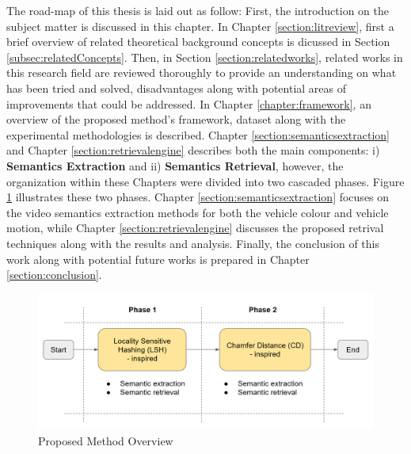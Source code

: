The road-map of this thesis is laid out as follow: First, the introduction on the subject matter is discussed in this chapter. 
In Chapter \ref{section:litreview}, first a brief overview of related theoretical background concepts is dicussed in Section \ref{subsec:relatedConcepts}. Then, in Section \ref{section:relatedworks}, related works in this research field are reviewed thoroughly to provide an understanding on what has been tried and solved, disadvantages along with potential areas of improvements that could be addressed. 
In Chapter \ref{chapter:framework}, an overview of the proposed method's framework, dataset along with the experimental methodologies is described.
Chapter \ref{section:semanticsextraction} and Chapter \ref{section:retrievalengine} describes both the main components: i) \textbf{Semantics Extraction} and ii) \textbf{Semantics Retrieval}, however, the organization within these Chapters were divided into two cascaded phases. 
Figure \ref{fig:proposedmethodoverview} illustrates these two phases.
Chapter \ref{section:semanticsextraction} focuses on the video semantics extraction methods for both the vehicle colour and vehicle motion, while Chapter \ref{section:retrievalengine} discusses the proposed retrival techniques along with the results and analysis.
Finally, the conclusion of this work along with potential future works is prepared in Chapter \ref{section:conclusion}.



\begin{figure}[!hbt]\centering
\includegraphics[width=\textwidth]{image/general/phases.PNG}
\caption{Proposed Method Overview}
\label{fig:proposedmethodoverview}
\end{figure}